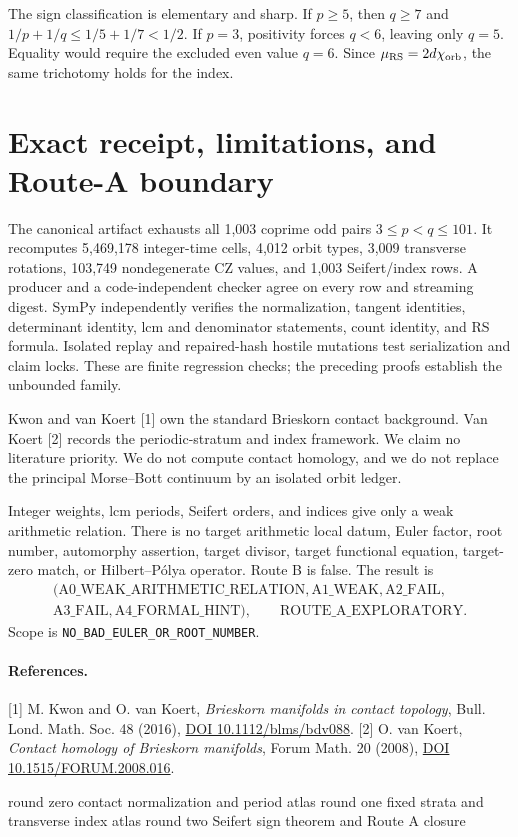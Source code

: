 \documentclass[10pt]{article}
\newcommand{\RS}{\mathrm{RS}}
\begin{document}
The sign classification is elementary and sharp.  If $p\geq5$, then $q\geq7$
and $1/p+1/q\leq1/5+1/7<1/2$.  If $p=3$, positivity forces $q<6$, leaving only
$q=5$.  Equality would require the excluded even value $q=6$.  Since
$\mu_{\RS}=2d\chi_{\rm orb}$, the same trichotomy holds for the index.

\section{Exact receipt, limitations, and Route-A boundary}
The canonical artifact exhausts all 1,003 coprime odd pairs
$3\leq p<q\leq101$.  It recomputes 5,469,178 integer-time cells, 4,012 orbit
types, 3,009 transverse rotations, 103,749 nondegenerate CZ values, and 1,003
Seifert/index rows.  A producer and a code-independent checker agree on every
row and streaming digest.  SymPy independently verifies the normalization,
tangent identities, determinant identity, lcm and denominator statements,
count identity, and RS formula.  Isolated replay and repaired-hash hostile
mutations test serialization and claim locks.  These are finite regression
checks; the preceding proofs establish the unbounded family.

Kwon and van Koert [1] own the standard Brieskorn contact background.  Van
Koert [2] records the periodic-stratum and index framework.  We claim no
literature priority.  We do not compute contact homology, and we do not replace
the principal Morse--Bott continuum by an isolated orbit ledger.

Integer weights, lcm periods, Seifert orders, and indices give only a weak
arithmetic relation.  There is no target arithmetic local datum, Euler factor,
root number, automorphy assertion, target divisor, target functional equation,
target-zero match, or Hilbert--Pólya operator.  Route B is false.  The result is
\[
\begin{gathered}
(\mathrm{A0\_WEAK\_ARITHMETIC\_RELATION},\mathrm{A1\_WEAK},
\mathrm{A2\_FAIL},\\
\mathrm{A3\_FAIL},\mathrm{A4\_FORMAL\_HINT}),
\qquad \mathrm{ROUTE\_A\_EXPLORATORY}.
\end{gathered}
\]
Scope is \texttt{NO\_BAD\_EULER\_OR\_ROOT\_NUMBER}.

\paragraph{References.}
[1] M. Kwon and O. van Koert, \emph{Brieskorn manifolds in contact topology},
Bull. Lond. Math. Soc. 48 (2016),
\href{https://doi.org/10.1112/blms/bdv088}{DOI 10.1112/blms/bdv088}.
[2] O. van Koert, \emph{Contact homology of Brieskorn manifolds}, Forum Math.
20 (2008),
\href{https://doi.org/10.1515/FORUM.2008.016}{DOI 10.1515/FORUM.2008.016}.
\fi

\vfill\noindent\footnotesize
\ifcase\CRevisionRound
round zero contact normalization and period atlas
\or round one fixed strata and transverse index atlas
\else round two Seifert sign theorem and Route A closure
\fi
\end{document}
